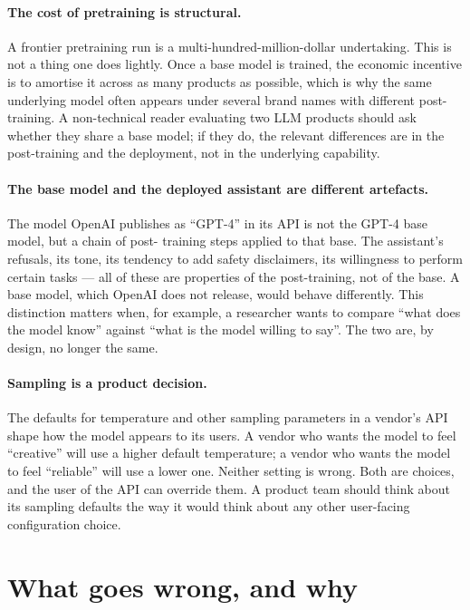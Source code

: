 \paragraph{The cost of pretraining is structural.} A frontier
pretraining run is a multi-hundred-million-dollar undertaking.
This is not a thing one does lightly. Once a base model is
trained, the economic incentive is to amortise it across as
many products as possible, which is why the same underlying
model often appears under several brand names with different
post-training. A non-technical reader evaluating two LLM
products should ask whether they share a base model; if they
do, the relevant differences are in the post-training and the
deployment, not in the underlying capability.

\paragraph{The base model and the deployed assistant are
different artefacts.} The model OpenAI publishes as ``GPT-4''
in its API is not the GPT-4 base model, but a chain of post-
training steps applied to that base. The assistant's refusals,
its tone, its tendency to add safety disclaimers, its
willingness to perform certain tasks --- all of these are
properties of the post-training, not of the base. A base model,
which OpenAI does not release, would behave differently. This
distinction matters when, for example, a researcher wants to
compare ``what does the model know'' against ``what is the
model willing to say''. The two are, by design, no longer the
same.

\paragraph{Sampling is a product decision.} The defaults for
temperature and other sampling parameters in a vendor's API
shape how the model appears to its users. A vendor who wants
the model to feel ``creative'' will use a higher default
temperature; a vendor who wants the model to feel ``reliable''
will use a lower one. Neither setting is wrong. Both are
choices, and the user of the API can override them. A product
team should think about its sampling defaults the way it would
think about any other user-facing configuration choice.

\section{What goes wrong, and why}

